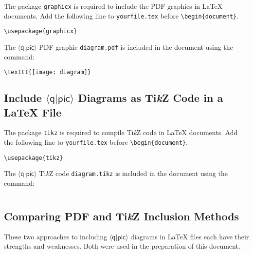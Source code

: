 \documentclass[twoside,12pt]{article}
\newcommand{\qpic}{$\langle\mathsf{q}|\mathsf{pic}\rangle$\xspace}
\newcommand{\TikZ}{Ti\emph{k}Z\xspace}
\begin{document}
The package {\tt graphicx} is required to include the PDF graphics in {\LaTeX} documents.
Add the following line to {\tt yourfile.tex} before \verb|\begin{document}|.

\begin{minipage}{5in}
\begin{lstlisting}[basicstyle=\normalsize\ttfamily]
\usepackage{graphicx}
\end{lstlisting}
\end{minipage}

The \qpic PDF graphic {\tt diagram.pdf} is included in the document using the command:

\begin{minipage}{5in}
\begin{lstlisting}[basicstyle=\normalsize\ttfamily]
\texttt{[image: diagram]}
\end{lstlisting}
\end{minipage}

\subsection{Include \qpic Diagrams as \TikZ Code in a {\LaTeX} File}

The package {\tt tikz} is required to compile \TikZ code in {\LaTeX} documents.
Add the following line to {\tt yourfile.tex} before \verb|\begin{document}|.

\begin{minipage}{5in}
\begin{lstlisting}[basicstyle=\normalsize\ttfamily]
\usepackage{tikz}
\end{lstlisting}
\end{minipage}


The \qpic \TikZ code {\tt diagram.tikz} is included in the document using the command:

\begin{minipage}{5in}
\begin{lstlisting}[basicstyle=\ttfamily]

\end{lstlisting}
\end{minipage}

\subsection{Comparing PDF and \TikZ Inclusion Methods}
These two approaches to including \qpic diagrams in {\LaTeX} files each have their strengths and weaknesses.  Both were used in the preparation of this document.
\end{document}
